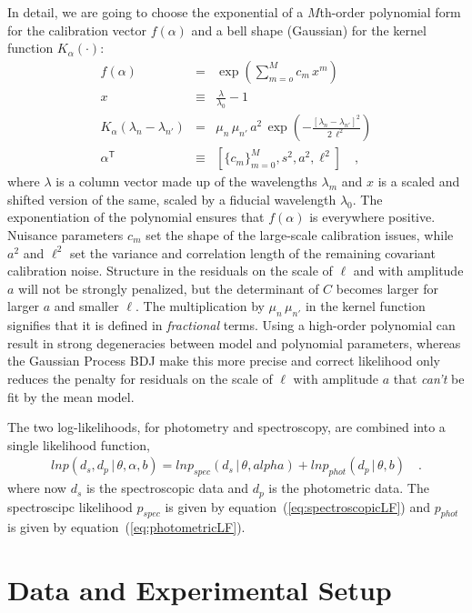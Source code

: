 \documentclass[iop,numberedappendix]{emulateapj}
\newcommand{\transpose}[1]{{#1}^{\!\mathsf T}}
\newcommand{\given}{\,|\,}
\begin{document}
In detail, we are going to choose the exponential of a $M$th-order
polynomial form for the calibration vector $f(\alpha)$ and a bell
shape (Gaussian) for the kernel function $K_\alpha(\cdot)$:
\begin{eqnarray}\displaystyle
f(\alpha) &=& \exp\left(\sum_{m=o}^M c_m\,x^m\right)
\\
x &\equiv& \frac{\lambda}{\lambda_0} - 1
\\
K_\alpha(\lambda_n - \lambda_{n'}) &=& \mu_n\,\mu_{n'}\, a^2\,\exp\left(-\frac{[\lambda_n - \lambda_{n'}]^2}{2\,\ell^2}\right)
\\
\transpose{\alpha} &\equiv& \left[ \{c_m\}_{m=0}^M, s^2, a^2, \ell^2 \right]
\quad ,
\end{eqnarray}
where $\lambda$ is a column vector made up of the wavelengths
$\lambda_m$ and $x$ is a scaled and shifted version of the same,
scaled by a fiducial wavelength $\lambda_0$.  The exponentiation of
the polynomial ensures that $f(\alpha)$ is everywhere positive.
Nuisance parameters $c_m$ set the shape of the large-scale calibration
issues, while $a^2$ and $\ell^2$ set the variance and correlation
length of the remaining covariant calibration noise. Structure in the
residuals on the scale of $\ell$ and with amplitude $a$ will not be
strongly penalized, but the determinant of $C$ becomes larger for
larger $a$ and smaller $\ell$. The multiplication by $\mu_n\,
\mu_{n'}$ in the kernel function signifies that it is defined in
\emph{fractional} terms.  Using a high-order polynomial can result in
strong degeneracies between model and polynomial parameters, whereas
the Gaussian Process {\color{blue} BDJ make this more precise and
correct} likelihood only reduces the penalty for residuals on the
scale of $\ell$ with amplitude $a$ that {\it can't} be fit by the mean
model.

The two log-likelihoods, for photometry and spectroscopy, are combined
into a single likelihood function,
\begin{eqnarray}\displaystyle ln p(d_s, d_p\given \theta, \alpha, b) =
ln p_{spec}(d_s\given \theta, alpha) + ln p_{phot}(d_p\given \theta,
b) \quad .
\end{eqnarray} where now $d_s$ is the spectroscopic data and $d_p$ is
the photometric data.  The spectroscipc likelihood $p_{spec}$ is given
by equation~(\ref{eq:spectroscopicLF}) and $p_{phot}$ is given by
equation~(\ref{eq:photometricLF}).

\section{Data and Experimental Setup}
\end{document}
